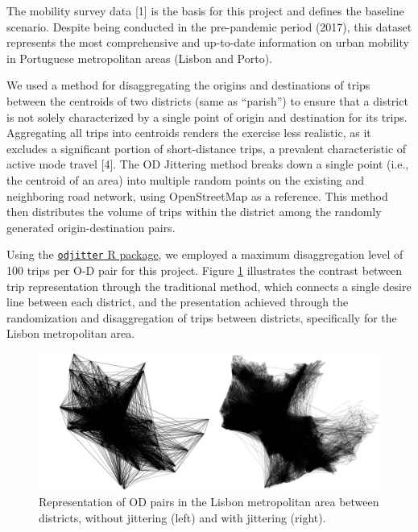 \documentclass[runningheads]{llncs}
\begin{document}
The mobility survey data {[}1{]} is the basis for this project and
defines the baseline scenario. Despite being conducted in the
pre-pandemic period (2017), this dataset represents the most
comprehensive and up-to-date information on urban mobility in Portuguese
metropolitan areas (Lisbon and Porto).

We used a method for disaggregating the origins and destinations of
trips between the centroids of two districts (same as ``parish'') to
ensure that a district is not solely characterized by a single point of
origin and destination for its trips. Aggregating all trips into
centroids renders the exercise less realistic, as it excludes a
significant portion of short-distance trips, a prevalent characteristic
of active mode travel {[}4{]}. The OD Jittering method breaks down a
single point (i.e., the centroid of an area) into multiple random points
on the existing and neighboring road network, using OpenStreetMap as a
reference. This method then distributes the volume of trips within the
district among the randomly generated origin-destination pairs.

Using the
\href{https://github.com/dabreegster/odjitter}{\texttt{odjitter} R
package}, we employed a maximum disaggregation level of 100 trips per
O-D pair for this project. Figure \ref{fig:jitter} illustrates the
contrast between trip representation through the traditional method,
which connects a single desire line between each district, and the
presentation achieved through the randomization and disaggregation of
trips between districts, specifically for the Lisbon metropolitan area.

\begin{figure}

{\centering \includegraphics[width=1\linewidth,]{img/jitter} 

}

\caption{Representation of OD pairs in the Lisbon metropolitan area between districts, without jittering (left) and with jittering (right).}\label{fig:jitter}
\end{figure}
\end{document}
